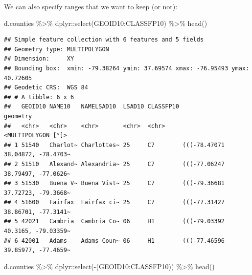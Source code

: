 \documentclass[]{article}
\newenvironment{Shaded}{\begin{snugshade}}{\end{snugshade}}
\newcommand{\FunctionTok}[1]{\textcolor[rgb]{0.00,0.00,0.00}{#1}}
\newcommand{\NormalTok}[1]{#1}
\newcommand{\SpecialCharTok}[1]{\textcolor[rgb]{0.00,0.00,0.00}{#1}}
\begin{document}
We can also specify ranges that we want to keep (or not):

\begin{Shaded}
\begin{Highlighting}[]
\NormalTok{d.counties }\SpecialCharTok{\%\textgreater{}\%}\NormalTok{ dplyr}\SpecialCharTok{::}\FunctionTok{select}\NormalTok{(GEOID10}\SpecialCharTok{:}\NormalTok{CLASSFP10) }\SpecialCharTok{\%\textgreater{}\%} \FunctionTok{head}\NormalTok{() }
\end{Highlighting}
\end{Shaded}

\begin{verbatim}
## Simple feature collection with 6 features and 5 fields
## Geometry type: MULTIPOLYGON
## Dimension:     XY
## Bounding box:  xmin: -79.38264 ymin: 37.69574 xmax: -76.95493 ymax: 40.72605
## Geodetic CRS:  WGS 84
## # A tibble: 6 x 6
##   GEOID10 NAME10   NAMELSAD10  LSAD10 CLASSFP10                         geometry
##   <chr>   <chr>    <chr>       <chr>  <chr>                   <MULTIPOLYGON [°]>
## 1 51540   Charlot~ Charlottes~ 25     C7        (((-78.47071 38.04872, -78.4703~
## 2 51510   Alexand~ Alexandria~ 25     C7        (((-77.06247 38.79497, -77.0626~
## 3 51530   Buena V~ Buena Vist~ 25     C7        (((-79.36681 37.72723, -79.3668~
## 4 51600   Fairfax  Fairfax ci~ 25     C7        (((-77.31427 38.86701, -77.3141~
## 5 42021   Cambria  Cambria Co~ 06     H1        (((-79.03392 40.3165, -79.03359~
## 6 42001   Adams    Adams Coun~ 06     H1        (((-77.46596 39.85977, -77.4659~
\end{verbatim}

\begin{Shaded}
\begin{Highlighting}[]
\NormalTok{d.counties }\SpecialCharTok{\%\textgreater{}\%}\NormalTok{ dplyr}\SpecialCharTok{::}\FunctionTok{select}\NormalTok{(}\SpecialCharTok{{-}}\NormalTok{(GEOID10}\SpecialCharTok{:}\NormalTok{CLASSFP10)) }\SpecialCharTok{\%\textgreater{}\%} \FunctionTok{head}\NormalTok{() }
\end{Highlighting}
\end{Shaded}
\end{document}
